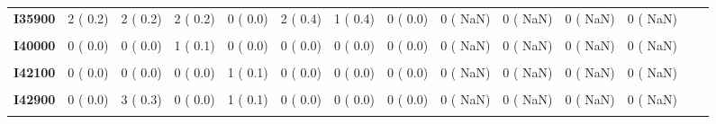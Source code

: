 \documentclass[
]{article}
\begin{document}
\begin{table}[H]
\begin{tabular}[t]{>{\raggedright\arraybackslash}p{5em}ccccccccccccc}
\textbf{I35900} & 2 (  0.2) & 2 (  0.2) & 2 (  0.2) & 0 (  0.0) & 2 (  0.4) & 1 (  0.4) & 0 (  0.0) & 0 (  NaN) & 0 (  NaN) & 0 (  NaN) & 0 (  NaN) &  & \\
\textbf{\cellcolor{gray!10}{I38000}} & \cellcolor{gray!10}{0 (  0.0)} & \cellcolor{gray!10}{0 (  0.0)} & \cellcolor{gray!10}{0 (  0.0)} & \cellcolor{gray!10}{1 (  0.1)} & \cellcolor{gray!10}{0 (  0.0)} & \cellcolor{gray!10}{0 (  0.0)} & \cellcolor{gray!10}{0 (  0.0)} & \cellcolor{gray!10}{0 (  NaN)} & \cellcolor{gray!10}{0 (  NaN)} & \cellcolor{gray!10}{0 (  NaN)} & \cellcolor{gray!10}{0 (  NaN)} & \cellcolor{gray!10}{} & \cellcolor{gray!10}{}\\
\textbf{I40000} & 0 (  0.0) & 0 (  0.0) & 1 (  0.1) & 0 (  0.0) & 0 (  0.0) & 0 (  0.0) & 0 (  0.0) & 0 (  NaN) & 0 (  NaN) & 0 (  NaN) & 0 (  NaN) &  & \\
\textbf{\cellcolor{gray!10}{I42000}} & \cellcolor{gray!10}{0 (  0.0)} & \cellcolor{gray!10}{2 (  0.2)} & \cellcolor{gray!10}{2 (  0.2)} & \cellcolor{gray!10}{1 (  0.1)} & \cellcolor{gray!10}{0 (  0.0)} & \cellcolor{gray!10}{0 (  0.0)} & \cellcolor{gray!10}{0 (  0.0)} & \cellcolor{gray!10}{0 (  NaN)} & \cellcolor{gray!10}{0 (  NaN)} & \cellcolor{gray!10}{0 (  NaN)} & \cellcolor{gray!10}{0 (  NaN)} & \cellcolor{gray!10}{} & \cellcolor{gray!10}{}\\
\textbf{I42100} & 0 (  0.0) & 0 (  0.0) & 0 (  0.0) & 1 (  0.1) & 0 (  0.0) & 0 (  0.0) & 0 (  0.0) & 0 (  NaN) & 0 (  NaN) & 0 (  NaN) & 0 (  NaN) &  & \\
\textbf{\cellcolor{gray!10}{I42800}} & \cellcolor{gray!10}{0 (  0.0)} & \cellcolor{gray!10}{1 (  0.1)} & \cellcolor{gray!10}{0 (  0.0)} & \cellcolor{gray!10}{0 (  0.0)} & \cellcolor{gray!10}{0 (  0.0)} & \cellcolor{gray!10}{0 (  0.0)} & \cellcolor{gray!10}{0 (  0.0)} & \cellcolor{gray!10}{0 (  NaN)} & \cellcolor{gray!10}{0 (  NaN)} & \cellcolor{gray!10}{0 (  NaN)} & \cellcolor{gray!10}{0 (  NaN)} & \cellcolor{gray!10}{} & \cellcolor{gray!10}{}\\
\textbf{I42900} & 0 (  0.0) & 3 (  0.3) & 0 (  0.0) & 1 (  0.1) & 0 (  0.0) & 0 (  0.0) & 0 (  0.0) & 0 (  NaN) & 0 (  NaN) & 0 (  NaN) & 0 (  NaN) &  & \\
\textbf{\cellcolor{gray!10}{I44200}} & \cellcolor{gray!10}{1 (  0.1)} & \cellcolor{gray!10}{1 (  0.1)} & \cellcolor{gray!10}{1 (  0.1)} & \cellcolor{gray!10}{0 (  0.0)} & \cellcolor{gray!10}{2 (  0.4)} & \cellcolor{gray!10}{0 (  0.0)} & \cellcolor{gray!10}{0 (  0.0)} & \cellcolor{gray!10}{0 (  NaN)} & \cellcolor{gray!10}{0 (  NaN)} & \cellcolor{gray!10}{0 (  NaN)} & \cellcolor{gray!10}{0 (  NaN)} & \cellcolor{gray!10}{} & \cellcolor{gray!10}{}\\

\end{tabular}
\end{table}
\end{document}
